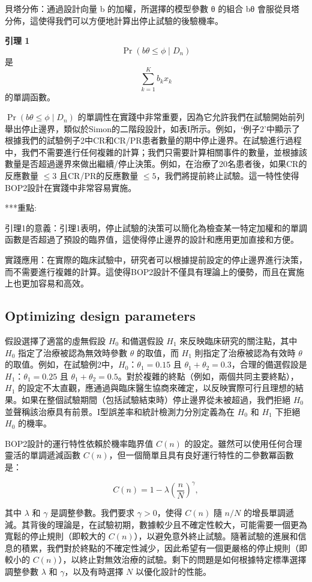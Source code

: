 貝塔分佈：通過設計向量 b 的加權，所選擇的模型參數 θ 的組合 bθ 會服從貝塔分佈，這使得我們可以方便地計算出停止試驗的後驗機率。



\textbf{引理 1}
\[
\Pr(b\theta \leq \phi \mid D_n)
\]
是
\[
\sum_{k=1}^{K} b_k x_k
\]
的單調函數。

\( \Pr(b\theta \leq \phi \mid D_n) \) 的單調性在實踐中非常重要，因為它允許我們在試驗開始前列舉出停止邊界，類似於Simon的二階段設計，如表I所示。例如，‘例子2’中顯示了根據我們的試驗例子2中CR和CR/PR患者數量的期中停止邊界。在試驗進行過程中，我們不需要進行任何複雜的計算；我們只需要計算相關事件的數量，並根據該數量是否超過邊界來做出繼續/停止決策。例如，在治療了20名患者後，如果CR的反應數量 \(\leq 3\) 且CR/PR的反應數量 \(\leq 5\)，我們將提前終止試驗。這一特性使得BOP2設計在實踐中非常容易實施。


***重點:

引理1的意義：引理1表明，停止試驗的決策可以簡化為檢查某一特定加權和的單調函數是否超過了預設的臨界值，這使得停止邊界的設計和應用更加直接和方便。

實踐應用：在實際的臨床試驗中，研究者可以根據提前設定的停止邊界進行決策，而不需要進行複雜的計算。這使得BOP2設計不僅具有理論上的優勢，而且在實施上也更加容易和高效。

\subsection{Optimizing design parameters}

假設選擇了適當的虛無假設 \( H_0 \) 和備選假設 \( H_1 \) 來反映臨床研究的關注點，其中 \( H_0 \) 指定了治療被認為無效時參數 \( \theta \) 的取值，而 \( H_1 \) 則指定了治療被認為有效時 \( \theta \) 的取值。例如，在試驗例2中，\( H_0 \)：\( \theta_1 = 0.15 \) 且 \( \theta_1 + \theta_2 = 0.3 \)，合理的備選假設是 \( H_1 \)：\( \theta_1 = 0.25 \) 且 \( \theta_1 + \theta_2 = 0.5 \)。對於複雜的終點（例如，兩個共同主要終點），\( H_1 \) 的設定不太直觀，應通過與臨床醫生協商來確定，以反映實際可行且理想的結果。如果在整個試驗期間（包括試驗結束時）停止邊界從未被超過，我們拒絕 \( H_0 \) 並聲稱該治療具有前景。I型誤差率和統計檢測力分別定義為在 \( H_0 \) 和 \( H_1 \) 下拒絕 \( H_0 \) 的機率。

BOP2設計的運行特性依賴於機率臨界值 \( C(n) \) 的設定。雖然可以使用任何合理靈活的單調遞減函數 \( C(n) \)，但一個簡單且具有良好運行特性的二參數冪函數是：

\[
C(n) = 1 - \lambda \left(\frac{n}{N}\right)^\gamma,
\]

其中 \( \lambda \) 和 \( \gamma \) 是調整參數。我們要求 \( \gamma > 0 \)，使得 \( C(n) \) 隨 \( n/N \) 的增長單調遞減。其背後的理論是，在試驗初期，數據較少且不確定性較大，可能需要一個更為寬鬆的停止規則（即較大的 \( C(n) \)），以避免意外終止試驗。隨著試驗的進展和信息的積累，我們對於終點的不確定性減少，因此希望有一個更嚴格的停止規則（即較小的 \( C(n) \)），以終止對無效治療的試驗。剩下的問題是如何根據特定標準選擇調整參數 \( \lambda \) 和 \( \gamma \)，以及有時選擇 \( N \) 以優化設計的性能。

